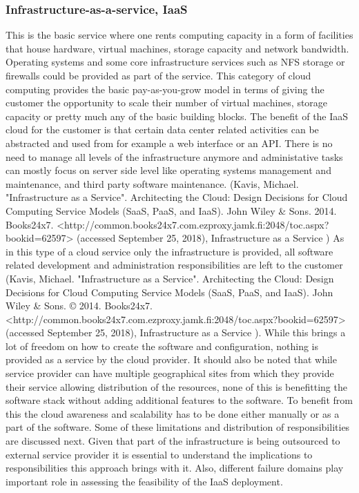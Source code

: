 \documentclass{article}
\begin{document}
\subsubsection{Infrastructure-as-a-service, IaaS}
This is the basic service where one rents computing capacity in a form of facilities that house hardware, virtual machines, storage capacity and network bandwidth.
Operating systems and some core infrastructure services such as NFS storage or firewalls could be provided as part of the service. This category of cloud computing provides the basic pay-as-you-grow model in terms of giving the customer the opportunity to scale their number of virtual machines, storage capacity or pretty much any of the basic building blocks.
The benefit of the IaaS cloud for the customer is that certain data center related activities can be abstracted and used from for example a web interface or an API. There is no need to manage all levels of the infrastructure anymore and administative tasks can mostly focus on server side level like operating systems management and maintenance, and third party software maintenance. (Kavis, Michael. "Infrastructure as a Service". Architecting the Cloud: Design Decisions for Cloud Computing Service Models (SaaS, PaaS, and IaaS). John Wiley \& Sons. 2014. Books24x7. <http://common.books24x7.com.ezproxy.jamk.fi:2048/toc.aspx?bookid=62597> (accessed September 25, 2018), Infrastructure as a Service )
As in this type of a cloud service only the infrastructure is provided, all software related development and administration responsibilities are left to the customer (Kavis, Michael. "Infrastructure as a Service". Architecting the Cloud: Design Decisions for Cloud Computing Service Models (SaaS, PaaS, and IaaS). John Wiley \& Sons. © 2014. Books24x7. <http://common.books24x7.com.ezproxy.jamk.fi:2048/toc.aspx?bookid=62597> (accessed September 25, 2018), Infrastructure as a Service ). While this brings a lot of freedom on how to create the software and configuration, nothing is provided as a service by the cloud provider.
It should also be noted that while service provider can have multiple geographical sites from which they provide their service allowing distribution of the resources, none of this is benefitting the software stack without adding additional features to the software. To benefit from this the cloud awareness and scalability has to be done either manually or as a part of the software. Some of these limitations and distribution of responsibilities are discussed next.
\newpage
Given that part of the infrastructure is being outsourced to external service provider it is essential to understand the implications to responsibilities this approach brings with it. Also, different failure domains play important role in assessing the feasibility of the IaaS deployment.
\end{document}
